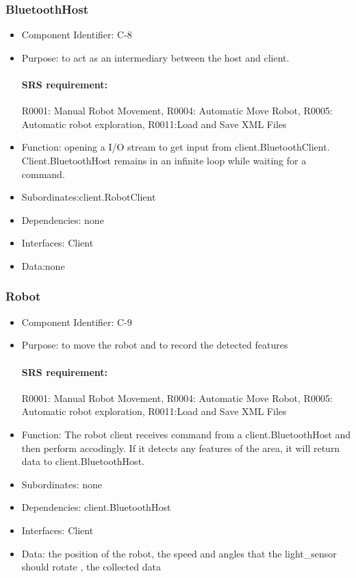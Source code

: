 \documentclass[11pt, a4paper]{report}
\begin{document}
\subsubsection{BluetoothHost}
\begin{itemize}
\item Component Identifier: C-8
\item Purpose: to act as an intermediary between the host and client.
\paragraph{SRS requirement:} R0001: Manual Robot Movement, R0004: Automatic Move Robot,
R0005: Automatic robot exploration, R0011:Load and Save XML Files
\item Function: opening a I/O stream to get input from client.BluetoothClient.
Client.BluetoothHost remains in an infinite loop while waiting for a command.
\item Subordinates:client.RobotClient
\item Dependencies: none
\item Interfaces: Client 
\item Data:none
\end{itemize}



\subsubsection{Robot}
\begin{itemize}
\item Component Identifier: C-9
\item Purpose: to move the robot and to record the detected features
\paragraph{SRS requirement:}R0001: Manual Robot Movement, R0004: Automatic Move Robot,
R0005: Automatic robot exploration, R0011:Load and Save XML Files
\item Function: The robot client receives command from a client.BluetoothHost and then perform 
accodingly. If it detects any features of the area, it will return data to client.BluetoothHost.
\item Subordinates: none
\item Dependencies: client.BluetoothHost
\item Interfaces:  Client
\item Data: the position of the robot, the speed and angles that the light_sensor should rotate
, the collected data
\end{itemize}
\end{document}
